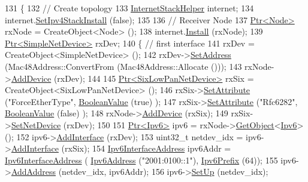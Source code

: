 \begin{DoxyCode}
131 \{
132   \textcolor{comment}{// Create topology}
133   \hyperlink{classns3_1_1InternetStackHelper}{InternetStackHelper} internet;
134   internet.\hyperlink{classns3_1_1InternetStackHelper_a10e2a35f410d0d1c90d979542c8bfd6e}{SetIpv4StackInstall} (\textcolor{keyword}{false});
135 
136   \textcolor{comment}{// Receiver Node}
137   \hyperlink{classns3_1_1Ptr}{Ptr<Node>} rxNode = CreateObject<Node> ();
138   internet.\hyperlink{classns3_1_1InternetStackHelper_a6645b412f31283d2d9bc3d8a95cebbc0}{Install} (rxNode);
139   \hyperlink{classns3_1_1Ptr}{Ptr<SimpleNetDevice>} rxDev;
140   \{ \textcolor{comment}{// first interface}
141     rxDev = CreateObject<SimpleNetDevice> ();
142     rxDev->\hyperlink{classns3_1_1SimpleNetDevice_a968ef3e7318bac29d5f1d7d977029af4}{SetAddress} (Mac48Address::ConvertFrom (Mac48Address::Allocate ()));
143     rxNode->\hyperlink{classns3_1_1Node_a42ff83ee1d5d1649c770d3f5b62375de}{AddDevice} (rxDev);
144 
145     \hyperlink{classns3_1_1Ptr}{Ptr<SixLowPanNetDevice>} rxSix = CreateObject<SixLowPanNetDevice> ();
146     rxSix->\hyperlink{classns3_1_1ObjectBase_ac60245d3ea4123bbc9b1d391f1f6592f}{SetAttribute} (\textcolor{stringliteral}{"ForceEtherType"}, \hyperlink{classns3_1_1BooleanValue}{BooleanValue} (\textcolor{keyword}{true}) );
147     rxSix->\hyperlink{classns3_1_1ObjectBase_ac60245d3ea4123bbc9b1d391f1f6592f}{SetAttribute} (\textcolor{stringliteral}{"Rfc6282"}, \hyperlink{classns3_1_1BooleanValue}{BooleanValue} (\textcolor{keyword}{false}) );
148     rxNode->\hyperlink{classns3_1_1Node_a42ff83ee1d5d1649c770d3f5b62375de}{AddDevice} (rxSix);
149     rxSix->\hyperlink{classns3_1_1SixLowPanNetDevice_a81c74a5dc06e3fbad1a8b1c59d1f68fa}{SetNetDevice} (rxDev);
150 
151     \hyperlink{classns3_1_1Ptr}{Ptr<Ipv6>} ipv6 = rxNode->\hyperlink{classns3_1_1Object_a13e18c00017096c8381eb651d5bd0783}{GetObject}<\hyperlink{classns3_1_1Ipv6}{Ipv6}> ();
152     ipv6->\hyperlink{classns3_1_1Ipv6_a4fd7da82c16b8abf9ca15f982918e6a4}{AddInterface} (rxDev);
153     uint32\_t netdev\_idx = ipv6->\hyperlink{classns3_1_1Ipv6_a4fd7da82c16b8abf9ca15f982918e6a4}{AddInterface} (rxSix);
154     \hyperlink{classns3_1_1Ipv6InterfaceAddress}{Ipv6InterfaceAddress} ipv6Addr = \hyperlink{classns3_1_1Ipv6InterfaceAddress}{Ipv6InterfaceAddress} (
      \hyperlink{classns3_1_1Ipv6Address}{Ipv6Address} (\textcolor{stringliteral}{"2001:0100::1"}), \hyperlink{classns3_1_1Ipv6Prefix}{Ipv6Prefix} (64));
155     ipv6->\hyperlink{classns3_1_1Ipv6_a5cd576e83cf65445be3a0b5ffd1ddc5c}{AddAddress} (netdev\_idx, ipv6Addr);
156     ipv6->\hyperlink{classns3_1_1Ipv6_a8e61d85ec7fd342ed38fef2d040ed1b9}{SetUp} (netdev\_idx);

\end{DoxyCode}
